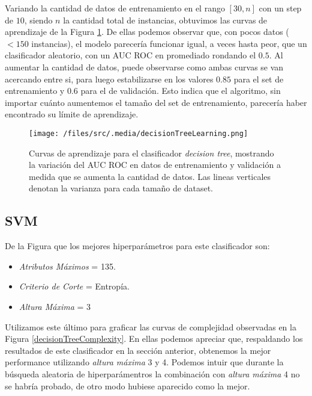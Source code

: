 
Variando la cantidad de datos de entrenamiento en el rango $[30, n]$ con un step de $10$, siendo $n$ la cantidad total de instancias, obtuvimos las curvas de aprendizaje de la Figura \ref{decisionTreeLearning}. De ellas podemos observar que, con pocos datos ($< 150$ instancias), el modelo parecería funcionar igual, a veces hasta peor, que un clasificador aleatorio, con un AUC ROC en promediado rondando el $0.5$. Al aumentar la cantidad de datos, puede observarse como ambas curvas se van acercando entre si, para luego estabilizarse en los valores $0.85$ para el set de entrenamiento y $0.6$ para el de validación. Esto indica que el algoritmo, sin importar cuánto aumentemos el tamaño del set de entrenamiento, parecería haber encontrado su límite de aprendizaje.

\begin{figure}[!htbp]
    \centering
    \texttt{[image: /files/src/.media/decisionTreeLearning.png]}
    \caption{Curvas de aprendizaje para el clasificador \textit{decision tree}, mostrando la variación del AUC ROC en datos de entrenamiento y validación a medida que se aumenta la cantidad de datos. Las lineas verticales denotan la varianza para cada tamaño de dataset.}
    \label{decisionTreeLearning}
\end{figure}


\subsection{SVM}
De la Figura  que los mejores hiperparámetros para este clasificador son:

\begin{itemize}
    \item \textit{Atributos Máximos} = 135.
    \item \textit{Criterio de Corte} = Entropía.
    \item \textit{Altura Máxima} = 3
\end{itemize}

Utilizamos este último para graficar las curvas de complejidad observadas en la Figura \ref{decisionTreeComplexity}. En ellas podemos apreciar que, respaldando los resultados de este clasificador en la sección anterior, obtenemos la mejor performance utilizando \textit{altura máxima} 3 y 4. Podemos intuir que durante la búsqueda aleatoria de hiperparámentros la combinación con \textit{altura máxima} 4 no se habría probado, de otro modo hubiese aparecido como la mejor.  

